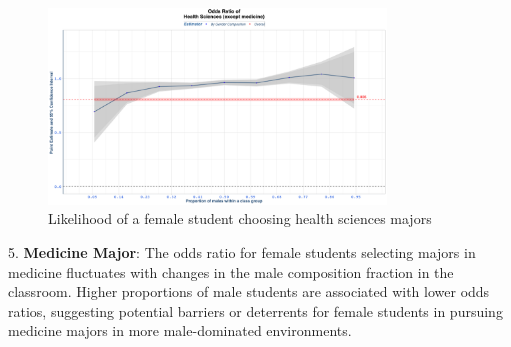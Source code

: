 \begin{figure}[H]
\centering
\includegraphics[width=0.8\textwidth]{Graph/Results/fe_panel_student_gender_composition_wome_in_HEALTH_SCIENCES_bce.png}
\caption{Likelihood of a female student choosing health sciences majors}
\label{fig:health_sciences}
\end{figure}




5. \textbf{Medicine Major}: The odds ratio for female students selecting majors in medicine fluctuates with changes in the male composition fraction in the classroom. Higher proportions of male students are associated with lower odds ratios, suggesting potential barriers or deterrents for female students in pursuing medicine majors in more male-dominated environments.

